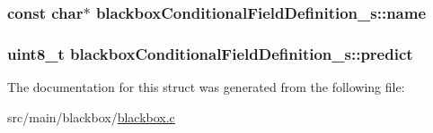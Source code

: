 \hypertarget{structblackboxConditionalFieldDefinition__s_a2aab63829ffa48767e0abed003258533}{
\subsubsection[{name}]{\setlength{\rightskip}{0pt plus 5cm}const char$\ast$ blackbox\+Conditional\+Field\+Definition\+\_\+s\+::name}}\label{structblackboxConditionalFieldDefinition__s_a2aab63829ffa48767e0abed003258533}
\hypertarget{structblackboxConditionalFieldDefinition__s_a47755a7ce3662bea640ac36a0774edee}{
\subsubsection[{predict}]{\setlength{\rightskip}{0pt plus 5cm}uint8\+\_\+t blackbox\+Conditional\+Field\+Definition\+\_\+s\+::predict}}\label{structblackboxConditionalFieldDefinition__s_a47755a7ce3662bea640ac36a0774edee}


The documentation for this struct was generated from the following file\+:\begin{DoxyCompactItemize}
\item 
src/main/blackbox/\hyperlink{blackbox_8c}{blackbox.\+c}\end{DoxyCompactItemize}
